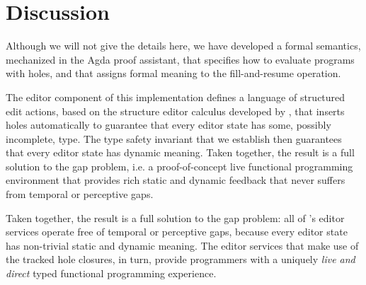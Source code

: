 \section{Discussion}
\label{sec:discussion}

Although we will not give the details here, we have developed a formal semantics,
mechanized in the Agda proof assistant, that
specifies how to evaluate programs with holes, and that assigns formal meaning to the fill-and-resume operation.

The editor component of this implementation defines a language of structured edit actions, 
based on the \Hazelnut structure editor calculus developed by \citet{popl-paper}, that inserts holes automatically to guarantee that
every editor state has some, possibly incomplete, type. 
The type safety invariant that we establish then guarantees that every editor state has dynamic meaning. Taken together, the result is a full solution to the gap problem, i.e. a proof-of-concept
live functional programming environment that provides rich static and dynamic feedback that never suffers from temporal or perceptive gaps.


Taken together, the result is a full solution to the gap problem: all of \Hazel's
editor services operate free of temporal or perceptive gaps, because every editor state
has non-trivial static and dynamic meaning. The editor services that make use of the 
tracked hole closures, in turn, provide \Hazel programmers with a uniquely 
\emph{live and direct} typed functional programming experience. 
